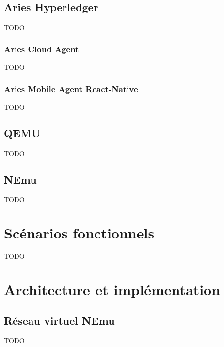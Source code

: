 \documentclass[12pt, openany]{report}
\begin{document}
\subsection{Aries Hyperledger}
\noindent 
\begin{flushleft}
TODO
\end{flushleft}

\subsubsection{Aries Cloud Agent}
\noindent 
\begin{flushleft}
TODO
\end{flushleft}

\subsubsection{Aries Mobile Agent React-Native}
\noindent 
\begin{flushleft}
TODO
\end{flushleft}

\subsection{QEMU}
\noindent 
\begin{flushleft}
TODO
\end{flushleft}

\subsection{NEmu}
\noindent 
\begin{flushleft}
TODO
\end{flushleft}

\section{Scénarios fonctionnels}
\noindent 
\begin{flushleft}
TODO
\end{flushleft}

\section{Architecture et implémentation}

\subsection{Réseau virtuel NEmu}
\noindent 
\begin{flushleft}
TODO
\end{flushleft}
\end{document}
